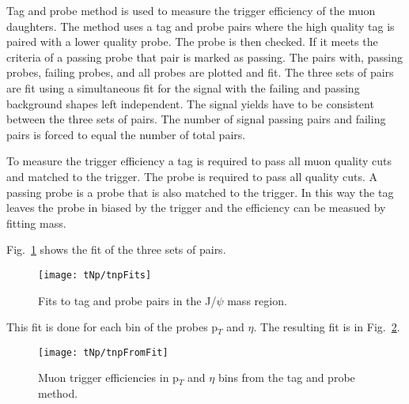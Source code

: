         Tag and probe method is used to measure the trigger efficiency of the 
          muon daughters. 
        The method uses a tag and probe pairs where the high quality tag is 
          paired with a lower quality probe. 
        The probe is then checked.
        If it meets the criteria of a passing probe that pair is marked as 
          passing. 
        The pairs with, passing probes, failing probes, and all probes are 
          plotted and fit. 
        The three sets of pairs are fit using a simultaneous fit for the signal
          with the failing and passing background shapes left independent.
        The signal yields have to be consistent between the three sets of pairs.
        The number of signal passing pairs and failing pairs is forced to 
          equal the number of total pairs. 

        To measure the trigger efficiency a tag is required to pass all muon
          quality cuts and matched to the trigger.
        The probe is required to pass all quality cuts. 
        A passing probe is a probe that is also matched to the trigger. 
        In this way the tag leaves the probe in biased by the trigger and the 
          efficiency can be measued by fitting mass.  

        Fig.~\ref{fig:tnpFitPlot} shows the fit of the three sets of pairs. 
        \begin{figure}[!Hh]
          \centering
          \texttt{[image: tNp/tnpFits]}
          \caption{Fits to tag and probe pairs in the J/$\psi$ mass region.}
          \label{fig:tnpFitPlot}
        \end{figure}
        This fit is done for each bin of the probes p$_{T}$ and $\eta$.
        The resulting fit is in Fig.~\ref{fig:tnpTrigMap}.
        \begin{figure}[!Hh]
          \centering
          \texttt{[image: tNp/tnpFromFit]}
          \caption{Muon trigger efficiencies in p$_{T}$ and $\eta$ bins from 
            the tag and probe method.}
          \label{fig:tnpTrigMap}
        \end{figure}
